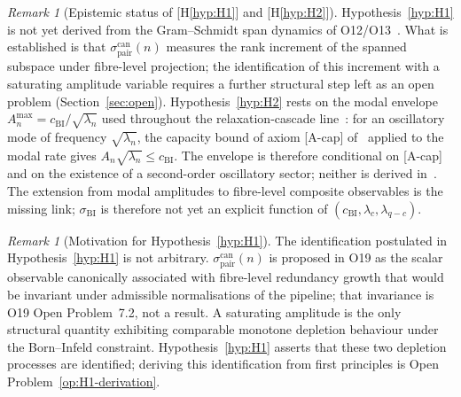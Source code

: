 \documentclass[11pt,a4paper]{article}
\theoremstyle{definition}
\theoremstyle{remark}
\newtheorem{remark}[theorem]{Remark}
\begin{document}
    \begin{remark}[Epistemic status of
    \textup{[H\ref{hyp:H1}]} and \textup{[H\ref{hyp:H2}]}]
      \label{rem:hyp-status}
      Hypothesis~\ref{hyp:H1} is not yet derived from the Gram--Schmidt
      span dynamics of O12/O13~\cite{Beau2026a16,Beau2026a17}.
      What is established is that
      $\sigma_{\mathrm{pair}}^{\mathrm{can}}(n)$ measures the rank
      increment of the spanned subspace under fibre-level projection;
      the identification of this increment with a saturating amplitude
      variable requires a further structural step left as an open problem
      (Section~\ref{sec:open}).
      Hypothesis~\ref{hyp:H2} rests on the modal envelope
      $A_n^{\max} = c_{\mathrm{BI}} / \sqrt{\lambda_n}$ used throughout the
      relaxation-cascade line~\cite{Beau2026a5}: for an oscillatory mode of
      frequency $\sqrt{\lambda_n}$, the capacity bound of axiom [A-cap]
      of~\cite{Beau2026c} applied to the modal rate gives
      $A_n \sqrt{\lambda_n} \leq c_{\mathrm{BI}}$.
      The envelope is therefore conditional on [A-cap] and on the existence
      of a second-order oscillatory sector; neither is derived
      in~\cite{Beau2026c}.
      The extension from modal amplitudes to fibre-level composite
      observables is the missing link; $\sigma_{\mathrm{BI}}$ is therefore
      not yet an explicit function of $(c_{\mathrm{BI}}, \lambda_c,
      \lambda_{q-c})$.
    \end{remark}

    \begin{remark}[Motivation for Hypothesis~\ref{hyp:H1}]
      \label{rem:H1-motivation}
      The identification postulated in Hypothesis~\ref{hyp:H1} is not
      arbitrary.
      $\sigma_{\mathrm{pair}}^{\mathrm{can}}(n)$ is proposed in O19 as the scalar
      observable canonically associated with fibre-level redundancy growth that would be
      invariant under admissible normalisations of the pipeline; that invariance is O19
      Open Problem~7.2, not a result.
      A saturating amplitude is the only structural quantity exhibiting
      comparable monotone depletion behaviour under the Born--Infeld
      constraint.
      Hypothesis~\ref{hyp:H1} asserts that these two depletion processes
      are identified; deriving this identification from first principles
      is Open Problem~\ref{op:H1-derivation}.
    \end{remark}
\end{document}
